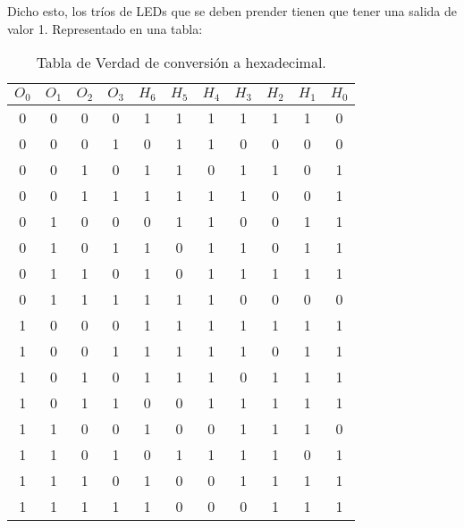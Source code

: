 \documentclass[a4paper,11pt]{article}
\begin{document}
Dicho esto, los tríos de LEDs que se deben prender tienen que tener una salida de valor 1. Representado en una tabla:

\begin{table}[h]
    \centering
    \begin{tabular}{c c c c | c c c c c c c}
        $O_0$ & $O_1$ & $O_2$ & $O_3$ & $H_6$ & $H_5$ & $H_4$ & $H_3$ & $H_2$ & $H_1$ & $H_0$  \\ \hline
        0  & 0  & 0  & 0  & 1  & 1  & 1  & 1  & 1  & 1  & 0  \\
        0  & 0  & 0  & 1  & 0  & 1  & 1  & 0  & 0  & 0  & 0  \\
        0  & 0  & 1  & 0  & 1  & 1  & 0  & 1  & 1  & 0  & 1  \\
        0  & 0  & 1  & 1  & 1  & 1  & 1  & 1  & 0  & 0  & 1  \\
        0  & 1  & 0  & 0  & 0  & 1  & 1  & 0  & 0  & 1  & 1  \\
        0  & 1  & 0  & 1  & 1  & 0  & 1  & 1  & 0  & 1  & 1  \\
        0  & 1  & 1  & 0  & 1  & 0  & 1  & 1  & 1  & 1  & 1  \\
        0  & 1  & 1  & 1  & 1  & 1  & 1  & 0  & 0  & 0  & 0  \\
        1  & 0  & 0  & 0  & 1  & 1  & 1  & 1  & 1  & 1  & 1  \\
        1  & 0  & 0  & 1  & 1  & 1  & 1  & 1  & 0  & 1  & 1  \\
        1  & 0  & 1  & 0  & 1  & 1  & 1  & 0  & 1  & 1  & 1  \\
        1  & 0  & 1  & 1  & 0  & 0  & 1  & 1  & 1  & 1  & 1  \\
        1  & 1  & 0  & 0  & 1  & 0  & 0  & 1  & 1  & 1  & 0  \\
        1  & 1  & 0  & 1  & 0  & 1  & 1  & 1  & 1  & 0  & 1  \\
        1  & 1  & 1  & 0  & 1  & 0  & 0  & 1  & 1  & 1  & 1  \\
        1  & 1  & 1  & 1  & 1  & 0  & 0  & 0  & 1  & 1  & 1  \\
    \end{tabular}
    \caption{Tabla de Verdad de conversión a hexadecimal.}
    \label{tab:hexa}
\end{table}
\end{document}

